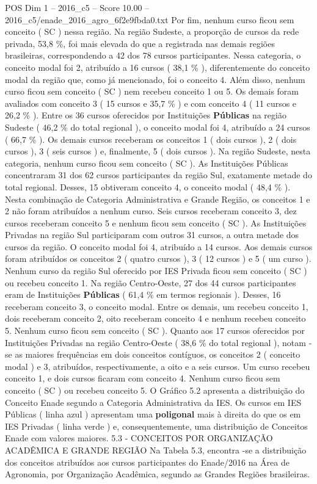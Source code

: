 \begin{textsample}{POS Dim 1 – 2016\_c5 – Score 10.00 – 2016\_c5/enade\_2016\_agro\_6f2e9fbda0.txt}
Por fim, nenhum curso ficou sem conceito ( SC ) nessa região.
Na região Sudeste, a proporção de cursos da rede privada, 53,8 \%, foi mais elevada do que a registrada nas demais regiões brasileiras, correspondendo a 42 dos 78 cursos participantes.
Nessa categoria, o conceito modal foi 2, atribuído a 16 cursos ( 38,1 \% ), diferentemente do conceito modal da região que, como já mencionado, foi o conceito 4.
Além disso, nenhum curso ficou sem conceito ( SC ) nem recebeu conceito 1 ou 5.
Os demais foram avaliados com conceito 3 ( 15 cursos e 35,7 \% ) e com conceito 4 ( 11 cursos e 26,2 \% ).
Entre os 36 cursos oferecidos por Instituições \textbf{Públicas} na região Sudeste ( 46,2 \% do total regional ), o conceito modal foi 4, atribuído a 24 cursos ( 66,7 \% ).
Os demais cursos receberam os conceitos 1 ( dois cursos ), 2 ( dois cursos ), 3 ( seis cursos ) e, finalmente, 5 ( dois cursos ).
Na região Sudeste, nesta categoria, nenhum curso ficou sem conceito ( SC ).
As Instituições Públicas concentraram 31 dos 62 cursos participantes da região Sul, exatamente metade do total regional.
Desses, 15 obtiveram conceito 4, o conceito modal ( 48,4 \% ).
Nesta combinação de Categoria Administrativa e Grande Região, os conceitos 1 e 2 não foram atribuídos a nenhum curso.
Seis cursos receberam conceito 3, dez cursos receberam conceito 5 e nenhum ficou sem conceito ( SC ).
As Instituições Privadas na região Sul participaram com outros 31 cursos, a outra metade dos cursos da região.
O conceito modal foi 4, atribuído a 14 cursos.
Aos demais cursos foram atribuídos os conceitos 2 ( quatro cursos ), 3 ( 12 cursos ) e 5 ( um curso ).
Nenhum curso da região Sul oferecido por IES Privada ficou sem conceito ( SC ) ou recebeu conceito 1.
Na região Centro-Oeste, 27 dos 44 cursos participantes eram de Instituições \textbf{Públicas} ( 61,4 \% em termos regionais ).
Desses, 16 receberam conceito 3, o conceito modal.
Entre os demais, um recebeu conceito 1, dois receberam conceito 2, oito receberam conceito 4 e nenhum recebeu conceito 5.
Nenhum curso ficou sem conceito ( SC ).
Quanto aos 17 cursos oferecidos por Instituições Privadas na região Centro-Oeste ( 38,6 \% do total regional ), notam -se as maiores frequências em dois conceitos contíguos, os conceitos 2 ( conceito modal ) e 3, atribuídos, respectivamente, a oito e a seis cursos.
Um curso recebeu conceito 1, e dois cursos ficaram com conceito 4.
Nenhum curso ficou sem conceito ( SC ) ou recebeu conceito 5.
O Gráfico 5.2 apresenta a distribuição do Conceito Enade segundo a Categoria Administrativa da IES.
Os cursos em IES Públicas ( linha azul ) apresentam uma \textbf{poligonal} mais à direita do que os em IES Privadas ( linha verde ) e, consequentemente, uma distribuição de Conceitos Enade com valores maiores. 5.3 - CONCEITOS POR ORGANIZAÇÃO ACADÊMICA E GRANDE REGIÃO Na Tabela 5.3, encontra -se a distribuição dos conceitos atribuídos aos cursos participantes do Enade/2016 na Área de Agronomia, por Organização Acadêmica, segundo as Grandes Regiões brasileiras.

\end{textsample}
